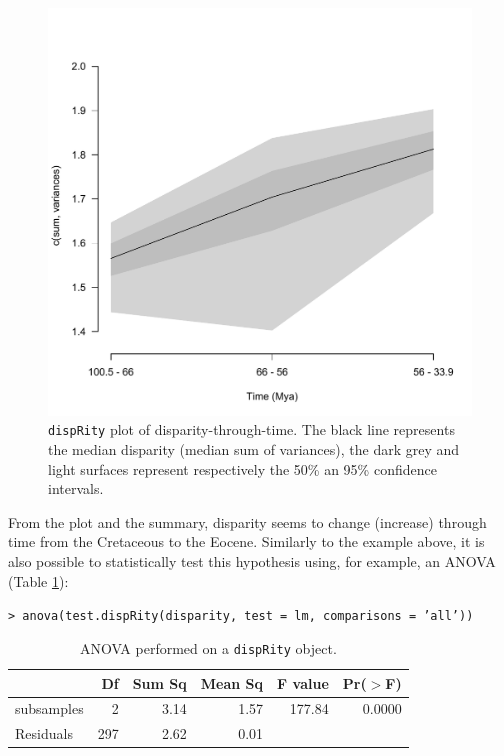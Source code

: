 \documentclass[12pt,letterpaper]{article}
\newcommand{\disp}{\texttt{dispRity} }
\begin{document}
\begin{figure}[!htbp]
\centering
   \includegraphics[width=1\textwidth]{plot_example_time.pdf} 
\caption{\disp plot of disparity-through-time. The black line represents the median disparity (median sum of variances), the dark grey and light surfaces represent respectively the 50\% an 95\% confidence intervals.}
\label{Fig:plot_time}
\end{figure}

From the plot and the summary, disparity seems to change (increase) through time from the Cretaceous to the Eocene.
Similarly to the example above, it is also possible to statistically test this hypothesis using, for example, an ANOVA (Table \ref{Tab:anova}): 

\noindent \texttt{> anova(test.dispRity(disparity, test = lm, comparisons = 'all'))}

\begin{table}[ht]
\centering
\begin{tabular}{lrrrrr}
  \hline
 & Df & Sum Sq & Mean Sq & F value & Pr($>$F) \\ 
  \hline
subsamples & 2 & 3.14 & 1.57 & 177.84 & 0.0000 \\ 
  Residuals & 297 & 2.62 & 0.01 &  &  \\ 
   \hline
\end{tabular}
\caption{ANOVA performed on a \disp object.}
\label{Tab:anova}
\end{table}
\end{document}
